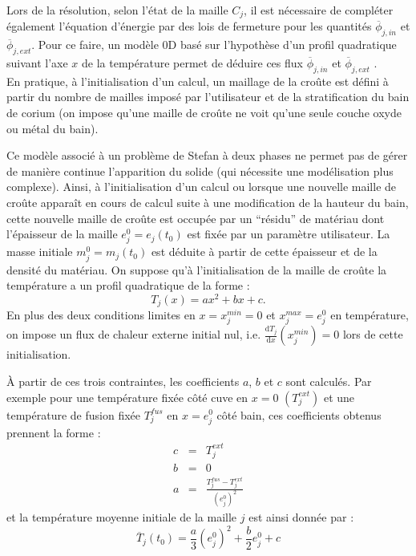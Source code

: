 Lors de la résolution, selon l'état de la maille $C_j$, il est nécessaire de compléter également l'équation d'énergie par des lois de fermeture pour les quantités $\overline{\phi}_{j,in}$ et $\overline{\phi}_{j,ext}$. Pour ce faire, un modèle 0D basé sur l'hypothèse d'un profil quadratique suivant l'axe $x$ de la température permet de déduire ces flux $\overline{\phi}_{j,in}$ et $\overline{\phi}_{j,ext}$ \cite{LeTellier2016}.\\

En pratique, à l'initialisation d'un calcul, un maillage de la croûte est défini à partir du nombre de mailles imposé par l'utilisateur et de la stratification du bain de corium (on impose qu'une maille de croûte ne voit qu'une seule couche oxyde ou métal du bain). 

Ce modèle associé à un problème de Stefan à deux phases ne permet pas de gérer de manière continue l'apparition du solide (qui nécessite une modélisation plus complexe). Ainsi, à l'initialisation d'un calcul ou lorsque une nouvelle maille de croûte apparaît en cours de calcul suite à une modification de la hauteur du bain, cette nouvelle maille de croûte est occupée par un ``résidu'' de matériau dont l'épaisseur de la maille $e_j^0=e_j(t_0)$ est fixée par un paramètre utilisateur. La masse initiale $m_j^0=m_j(t_0)$ est déduite à partir de cette épaisseur et de la densité du matériau. On suppose qu'à l'initialisation de la maille de croûte la température a un profil quadratique de la forme : 
$$T_j(x)=ax^2+bx+c.$$
En plus des deux conditions limites en $x=x_j^{min}=0$ et $x_j^{max}=e_j^0$ en température, on impose un flux de chaleur externe initial nul, i.e. $\frac{\mathrm{d}T_j}{\mathrm{d}x}(x_j^{min}) = 0$ lors de cette initialisation.

À partir de ces trois contraintes, les coefficients $a$, $b$ et $c$ sont calculés. Par exemple pour une température fixée côté cuve en $x=0$ $(T_j^{ext})$ et une température de fusion fixée $T_j^{fus}$ en $x=e_j^0$ côté bain, ces coefficients obtenus prennent la forme :
\begin{eqnarray*}
c &=& T^{ext}_j \\
b &=& 0 \\
a &=& \frac{T_j^{fus}-T^{ext}_j}{({e_j^0})^2}
\end{eqnarray*}
et la température moyenne initiale de la maille $j$ est ainsi donnée par :
$$\overline{T}_{j}(t_0)=\frac{a}{3} ({e_j^0})^2 + \frac{b}{2} e_j^0 + c$$
